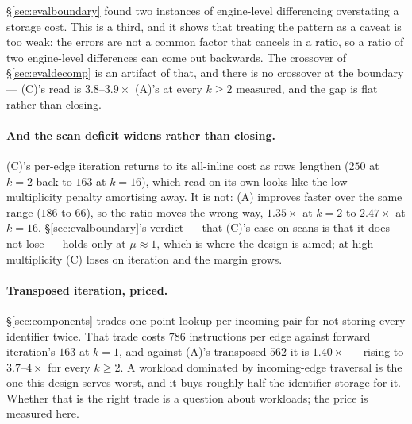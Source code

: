 \documentclass[11pt,a4paper]{article}
\theoremstyle{plain}
\theoremstyle{definition}
\theoremstyle{remark}
\begin{document}
\S\ref{sec:evalboundary} found two instances of engine-level differencing
overstating a storage cost. This is a third, and it shows that treating the
pattern as a caveat is too weak: the errors are not a common factor that cancels in
a ratio, so a ratio of two engine-level differences can come out backwards. The
crossover of \S\ref{sec:evaldecomp} is an artifact of that, and there is no
crossover at the boundary --- (C)'s read is $3.8$--$3.9\times$ (A)'s at every
$k \ge 2$ measured, and the gap is flat rather than closing.

\paragraph{And the scan deficit widens rather than closing.}
(C)'s per-edge iteration returns to its all-inline cost as rows lengthen
($250$ at $k=2$ back to $163$ at $k=16$), which read on its own looks like the
low-multiplicity penalty amortising away. It is not: (A) improves faster over the
same range ($186$ to $66$), so the ratio moves the wrong way, $1.35\times$ at
$k=2$ to $2.47\times$ at $k=16$. \S\ref{sec:evalboundary}'s verdict --- that (C)'s
case on scans is that it does not lose --- holds only at $\mu \approx 1$, which is
where the design is aimed; at high multiplicity (C) loses on iteration and the
margin grows.

\paragraph{Transposed iteration, priced.}
\S\ref{sec:components} trades one point lookup per incoming pair for not storing
every identifier twice. That trade costs $786$ instructions per edge against
forward iteration's $163$ at $k = 1$, and against (A)'s transposed $562$ it is
$1.40\times$ --- rising to $3.7$--$4\times$ for every $k \ge 2$. A workload
dominated by incoming-edge traversal is the one this design serves worst, and it
buys roughly half the identifier storage for it. Whether that is the right trade
is a question about workloads; the price is measured here.
\end{document}
